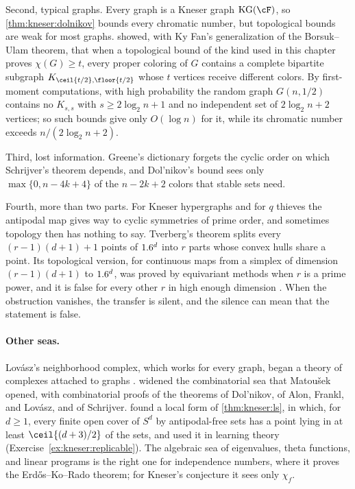 \begin{refsection}
Second, typical graphs. Every graph is a Kneser graph $\kneserKG(\cF)$, so \cref{thm:kneser:dolnikov} bounds every chromatic number, but topological bounds are weak for most graphs. \textcite{SimonyiTardos2006} showed, with Ky Fan's generalization of the Borsuk--Ulam theorem, that when a topological bound of the kind used in this chapter proves $\chi(G)\ge t$, every proper coloring of $G$ contains a complete bipartite subgraph $K_{\ceil{t/2},\floor{t/2}}$ whose $t$ vertices receive different colors. By first-moment computations, with high probability the random graph $G(n,1/2)$ contains no $K_{s,s}$ with $s\ge2\log_2n+1$ and no independent set of $2\log_2n+2$ vertices; so such bounds give only $O(\log n)$ for it, while its chromatic number exceeds $n/(2\log_2n+2)$.

Third, lost information. Greene's dictionary forgets the cyclic order on which Schrijver's theorem depends, and Dol'nikov's bound sees only $\max\{0,n-4k+4\}$ of the $n-2k+2$ colors that stable sets need.

Fourth, more than two parts. For Kneser hypergraphs and for $q$ thieves the antipodal map gives way to cyclic symmetries of prime order, and sometimes topology then has nothing to say. Tverberg's theorem splits every $(r-1)(d+1)+1$ points of $1.6^d$ into $r$ parts whose convex hulls share a point. Its topological version, for continuous maps from a simplex of dimension $(r-1)(d+1)$ to $1.6^d$, was proved by equivariant methods when $r$ is a prime power, and it is false for every other $r$ in high enough dimension \parencite{Frick2015}. When the obstruction vanishes, the transfer is silent, and the silence can mean that the statement is false.

\paragraph{Other seas.} Lov\'asz's neighborhood complex, which works for every graph, began a theory of complexes attached to graphs \parencite{Matousek2003}. \textcite{Ziegler2002} widened the combinatorial sea that Matoušek opened, with combinatorial proofs of the theorems of Dol'nikov, of Alon, Frankl, and Lov\'asz, and of Schrijver. \textcite{ChaseEtAl2024} found a local form of \cref{thm:kneser:ls}, in which, for $d\ge1$, every finite open cover of $S^d$ by antipodal-free sets has a point lying in at least $\ceil{(d+3)/2}$ of the sets, and used it in learning theory (Exercise~\ref{ex:kneser:replicable}). The algebraic sea of eigenvalues, theta functions, and linear programs is the right one for independence numbers, where it proves the Erd\H{o}s--Ko--Rado theorem; for Kneser's conjecture it sees only $\chi_f$.


\end{refsection}
